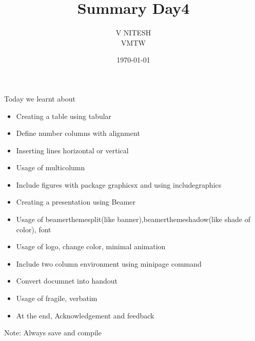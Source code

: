 \documentclass[12pt,a4paper]{article}
\title{Summary Day4}
\author{V NITESH \\ VMTW}
\date{\today}
\begin{document}
\maketitle
Today we learnt about
\begin{itemize}
\item Creating a table using tabular
\item Define number columns with alignment
\item Inserting lines horizontal or vertical
\item Usage of multicolumn
\item Include figures with package graphicsx and using includegraphics
\item Creating a presentation using Beamer
\item Usage of beamerthemesplit(like banner),beamerthemeshadow(like shade of color), font 
\item Usage of logo, change color, minimal animation
\item Include two column environment using minipage command
\item Convert documnet into handout
\item Usage of fragile, verbatim
\item At the end, Acknowledgement and feedback

\end{itemize}

Note: Always save and compile
\end{document}
